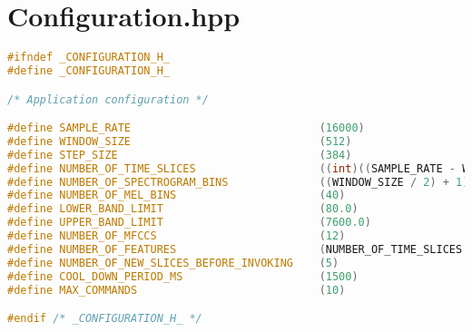 \chapter{Configuration.hpp}
\label{add:config}


\begin{lstlisting}[language=C++, caption=Konačna konfiguracija, label=code:conf]
#ifndef _CONFIGURATION_H_
#define _CONFIGURATION_H_

/* Application configuration */

#define SAMPLE_RATE                             (16000)
#define WINDOW_SIZE                             (512)
#define STEP_SIZE                               (384)
#define NUMBER_OF_TIME_SLICES                   ((int)((SAMPLE_RATE - WINDOW_SIZE) / STEP_SIZE) + 1)
#define NUMBER_OF_SPECTROGRAM_BINS              ((WINDOW_SIZE / 2) + 1)
#define NUMBER_OF_MEL_BINS                      (40)
#define LOWER_BAND_LIMIT                        (80.0)
#define UPPER_BAND_LIMIT                        (7600.0)
#define NUMBER_OF_MFCCS                         (12)
#define NUMBER_OF_FEATURES                      (NUMBER_OF_TIME_SLICES * NUMBER_OF_MFCCS)
#define NUMBER_OF_NEW_SLICES_BEFORE_INVOKING    (5)
#define COOL_DOWN_PERIOD_MS                     (1500)
#define MAX_COMMANDS                            (10)

#endif /* _CONFIGURATION_H_ */

\end{lstlisting}